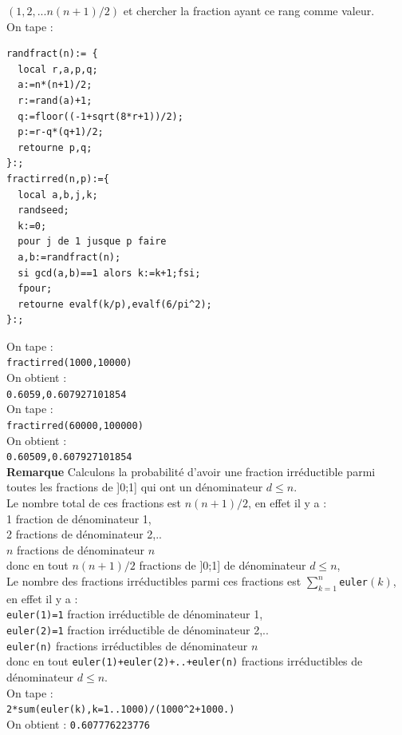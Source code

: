 \documentclass[a4paper,11pt]{book}
\begin{document}
\begin{enumerate}
$(1,2,...n(n+1)/2)$ et chercher la fraction ayant ce rang comme valeur.\\
On tape :\\
\begin{verbatim}
randfract(n):= {
  local r,a,p,q;
  a:=n*(n+1)/2;
  r:=rand(a)+1;
  q:=floor((-1+sqrt(8*r+1))/2);
  p:=r-q*(q+1)/2;
  retourne p,q;
}:;
fractirred(n,p):={
  local a,b,j,k;
  randseed;
  k:=0;
  pour j de 1 jusque p faire
  a,b:=randfract(n);
  si gcd(a,b)==1 alors k:=k+1;fsi;
  fpour;
  retourne evalf(k/p),evalf(6/pi^2);
}:;
\end{verbatim}
On tape :\\
{\tt fractirred(1000,10000)}\\
On obtient :\\
{\tt 0.6059,0.607927101854}\\  
On tape :\\
{\tt fractirred(60000,100000)}\\
On obtient :\\
{\tt 0.60509,0.607927101854}\\  
{\bf Remarque}
Calculons la probabilit\'e d'avoir une fraction irr\'eductible parmi toutes 
les fractions de ]0;1] qui ont un d\'enominateur $d\leq n$.\\
Le nombre total de ces fractions est $n(n+1)/2$, en effet il y a :\\
1 fraction de d\'enominateur 1,\\ 
2 fractions de d\'enominateur 2,..\\
$n$ fractions de d\'enominateur $n$\\ 
donc en tout $n(n+1)/2$ fractions de ]0;1] de d\'enominateur $d\leq n$,\\
Le nombre des fractions irr\'eductibles parmi ces fractions est 
$\sum_{k=1}^n${\tt euler}$(k)$, en effet il y a :\\
{\tt euler(1)=1} fraction irr\'eductible de d\'enominateur 1,\\
{\tt euler(2)=1} fraction irr\'eductible de d\'enominateur 2,..\\
{\tt euler(n)} fractions irr\'eductibles de d\'enominateur $n$ \\
donc en tout {\tt euler(1)+euler(2)+..+euler(n)} fractions irr\'eductibles de 
d\'enominateur $d\leq n$.\\
On tape :\\
{\tt 2*sum(euler(k),k=1..1000)/(1000\verb|^|2+1000.)}\\
On obtient :
{\tt 0.607776223776}\\

\end{enumerate}
\end{document}
